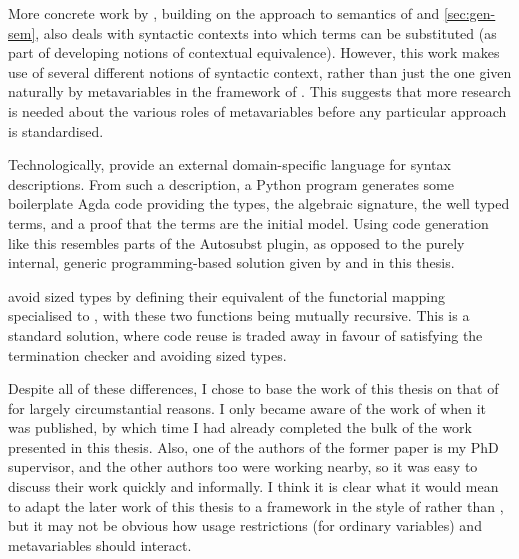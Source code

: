 More concrete work by \citet{MMS18}, building on the approach to semantics of
\citet{ACMM17} and \cref{sec:gen-sem}, also deals with syntactic contexts into
which terms can be substituted (as part of developing notions of contextual
equivalence).
However, this work makes use of several different notions of syntactic context,
rather than just the one given naturally by metavariables in the framework of
\citeauthor{FS22}.
This suggests that more research is needed about the various roles of
metavariables before any particular approach is standardised.

Technologically, \citeauthor{FS22} provide an external domain-specific language
for syntax descriptions.
From such a description, a Python program generates some boilerplate Agda code
providing the types, the algebraic signature, the well typed terms, and a proof
that the terms are the initial model.
Using code generation like this resembles parts of the Autosubst plugin, as
opposed to the purely internal, generic programming-based solution given by
\citeauthor{AACMM21} and in this thesis.

 avoid sized types by defining their equivalent of the
functorial mapping  specialised to , with
these two functions being mutually recursive.
This is a standard solution, where code reuse is traded away in favour of
satisfying the termination checker and avoiding sized types.

Despite all of these differences,
I chose to base the work of this thesis on that of \citet{AACMM21} for largely
circumstantial reasons.
I only became aware of the work of \citet{FS22} when it was published, by which
time I had already completed the bulk of the work presented in this thesis.
Also, one of the authors of the former paper is my PhD supervisor, and the other
authors too were working nearby, so it was easy to discuss their work quickly
and informally.
I think it is clear what it would mean to adapt the later work of this thesis to
a framework in the style of \citeauthor{FS22} rather than \citeauthor{AACMM21},
but it may not be obvious how usage restrictions (for ordinary variables) and
metavariables should interact.

